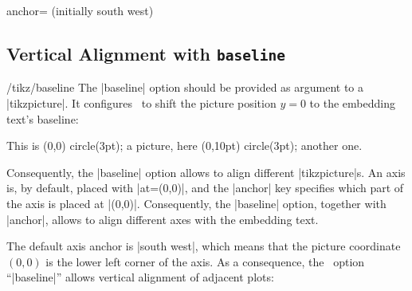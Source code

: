 \begin{pgfplotskey}{anchor= (initially south west)}
\subsection{Vertical Alignment with \texttt{baseline}}
\label{sec:align}%
\begin{key}{/tikz/baseline}
The |baseline| option should be provided as argument to a |tikzpicture|. It configures \Tikz\ to shift the picture position $y=0$ to the embedding text's baseline:
\begin{codeexample}[width=3cm]
This is \tikz[baseline]\fill[red] (0,0) circle(3pt); a picture,
here \tikz[baseline]\fill[red] (0,10pt) circle(3pt); another one.
\end{codeexample}
\noindent Consequently, the |baseline| option allows to align different |tikzpicture|s. An axis is, by default, placed with |at={(0,0)}|, and the |anchor| key specifies which part of the axis is placed at |(0,0)|. Consequently, the |baseline| option, together with |anchor|, allows to align different axes with the embedding text.

The default axis anchor is |south west|, which means that the picture coordinate $(0,0)$ is the lower left corner of the axis. As a consequence, the \Tikz\ option ``|baseline|'' allows vertical alignment of adjacent plots:
\begin{codeexample}[]
\pgfplotsset{domain=-1:1}
%
\hspace{0.15cm}
\end{codeexample}

\begin{codeexample}[]
\pgfplotsset{domain=-1:1}
%
\hspace{0.15cm}
\end{codeexample}


\end{key}
\end{pgfplotskey}
